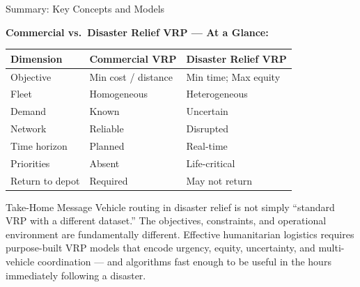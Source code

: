 \documentclass[aspectratio=169,10pt]{beamer}
\begin{document}
\begin{frame}[allowframebreaks]{Summary: Key Concepts and Models}
  \framebreak

  \textbf{Commercial vs.\ Disaster Relief VRP --- At a Glance:}
  \begin{center}
  \begin{tabular}{p{3.5cm} p{4.5cm} p{4.5cm}}
    \toprule
    \textbf{Dimension} & \textbf{Commercial VRP} & \textbf{Disaster Relief VRP} \\
    \midrule
    Objective & Min cost / distance & Min time; Max equity \\
    Fleet & Homogeneous & Heterogeneous \\
    Demand & Known & Uncertain \\
    Network & Reliable & Disrupted \\
    Time horizon & Planned & Real-time \\
    Priorities & Absent & Life-critical \\
    Return to depot & Required & May not return \\
    \bottomrule
  \end{tabular}
  \end{center}

  \medskip
  \begin{alertblock}{Take-Home Message}
    Vehicle routing in disaster relief is not simply ``standard VRP
    with a different dataset.''
    The objectives, constraints, and operational environment are
    fundamentally different.
    Effective humanitarian logistics requires purpose-built VRP models
    that encode urgency, equity, uncertainty, and multi-vehicle
    coordination --- and algorithms fast enough to be useful
    in the hours immediately following a disaster.
  \end{alertblock}
\end{frame}
\end{document}
